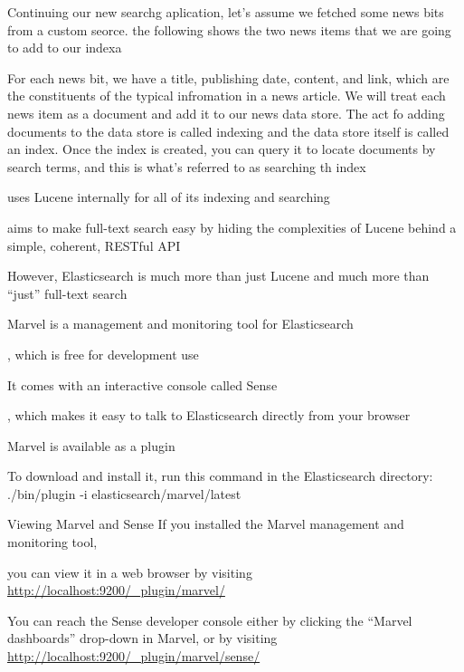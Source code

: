
Continuing our new searchg aplication, let's assume we fetched some news bits from a custom seorce. the following shows the two news items that we are going to add to our indexa

For each news bit, we have a title, publishing date, content, and link, which are the constituents of the typical infromation in a news article. We will treat each news item as a document and add it to our news data store. The act fo adding documents to the data store is called indexing and the data store itself is called an index. Once the index is created, you can query it to locate documents by search terms, and this is what's referred to as searching th index

uses Lucene internally for all of its indexing and searching

aims to make full-text search easy by hiding the complexities of Lucene behind a simple, coherent, RESTful API

However, Elasticsearch is much more than just Lucene and much more than “just” full-text search

Marvel is a management and monitoring tool for Elasticsearch

, which is free for development use

It comes with an interactive console called Sense

, which makes it easy to talk to Elasticsearch directly from your browser

Marvel is available as a plugin

To download and install it, run this command in the Elasticsearch directory: ./bin/plugin -i elasticsearch/marvel/latest 

Viewing Marvel and Sense If you installed the Marvel management and monitoring tool, 

you can view it in a web browser by visiting \url{http://localhost:9200/_plugin/marvel/}

You can reach the Sense developer console either by clicking the “Marvel dashboards” drop-down in Marvel, or by visiting \url{http://localhost:9200/_plugin/marvel/sense/}

